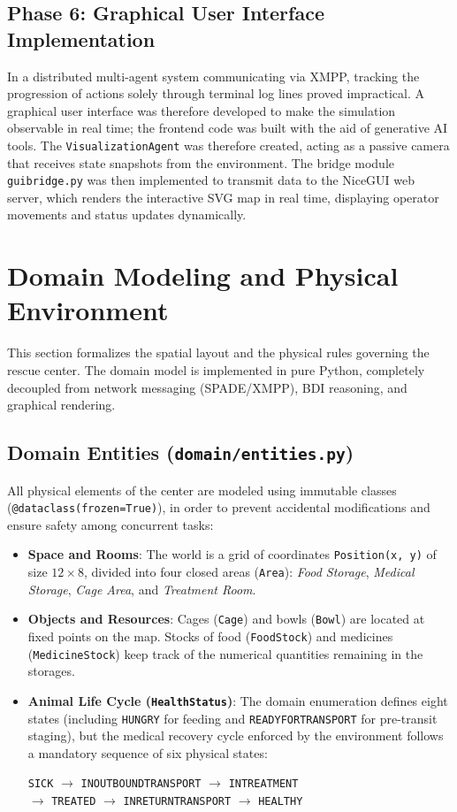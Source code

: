 \documentclass{article}
\renewcommand{\_}{\oldtextunderscore\allowbreak}
\begin{document}
\subsection{Phase 6: Graphical User Interface Implementation}
In a distributed multi-agent system communicating via XMPP, tracking the progression of actions solely through terminal log lines proved impractical. A graphical user interface was therefore developed to make the simulation observable in real time; the frontend code was built with the aid of generative AI tools.
The \texttt{VisualizationAgent} was therefore created, acting as a passive camera that receives state snapshots from the environment. The bridge module \texttt{gui\_bridge.py} was then implemented to transmit data to the NiceGUI web server, which renders the interactive SVG map in real time, displaying operator movements and status updates dynamically.

\section{Domain Modeling and Physical Environment}
This section formalizes the spatial layout and the physical rules governing the rescue center. The domain model is implemented in pure Python, completely decoupled from network messaging (SPADE/XMPP), BDI reasoning, and graphical rendering.
\subsection{Domain Entities (\texttt{domain/entities.py})}
All physical elements of the center are modeled using immutable classes (\texttt{@dataclass(frozen=True)}), in order to prevent accidental modifications and ensure safety among concurrent tasks:
\begin{itemize}
    \item \textbf{Space and Rooms}: The world is a grid of coordinates \texttt{Position(x, y)} of size $12 \times 8$, divided into four closed areas (\texttt{Area}): \textit{Food Storage}, \textit{Medical Storage}, \textit{Cage Area}, and \textit{Treatment Room}.
    \item \textbf{Objects and Resources}: Cages (\texttt{Cage}) and bowls (\texttt{Bowl}) are located at fixed points on the map. Stocks of food (\texttt{FoodStock}) and medicines (\texttt{MedicineStock}) keep track of the numerical quantities remaining in the storages.
    \item \textbf{Animal Life Cycle (\texttt{HealthStatus})}: The domain enumeration defines eight states (including \texttt{HUNGRY} for feeding and \texttt{READY\_FOR\_TRANSPORT} for pre-transit staging), but the medical recovery cycle enforced by the environment follows a mandatory sequence of six physical states:
\begin{center}
\small
\texttt{SICK} $\rightarrow$ \texttt{IN\_OUTBOUND\_TRANSPORT} $\rightarrow$ \texttt{IN\_TREATMENT} \\
$\rightarrow$ \texttt{TREATED} $\rightarrow$ \texttt{IN\_RETURN\_TRANSPORT} $\rightarrow$ \texttt{HEALTHY}
\end{center}
\end{itemize}
\end{document}
